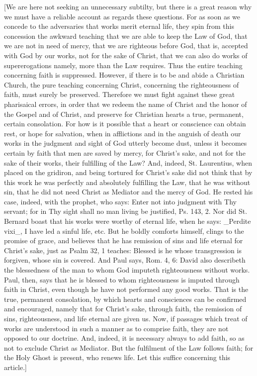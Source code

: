 [We are here not seeking an unnecessary subtilty, but there is a
great reason why we must have a reliable account as regards these
questions.  For as soon as we concede to the adversaries that works
merit eternal life, they spin from this concession the awkward
teaching that we are able to keep the Law of God, that we are not in
need of mercy, that we are righteous before God, that is, accepted
with God by our works, not for the sake of Christ, that we can also
do works of supererogations namely, more than the Law requires.  Thus
the entire teaching concerning faith is suppressed.  However, if
there is to be and abide a Christian Church, the pure teaching
concerning Christ, concerning the righteousness of faith, must surely
be preserved.  Therefore we must fight against these great
pharisaical errors, in order that we redeem the name of Christ and
the honor of the Gospel and of Christ, and preserve for Christian
hearts a true, permanent, certain consolation.  For how is it
possible that a heart or conscience can obtain rest, or hope for
salvation, when in afflictions and in the anguish of death our works
in the judgment and sight of God utterly become dust, unless it
becomes certain by faith that men are saved by mercy, for Christ's
sake, and not for the sake of their works, their fulfilling of the
Law?  And, indeed, St. Laurentius, when placed on the gridiron, and
being tortured for Christ's sake did not think that by this work he
was perfectly and absolutely fulfilling the Law, that he was without
sin, that he did not need Christ as Mediator and the mercy of God.
He rested his case, indeed, with the prophet, who says: Enter not
into judgment with Thy servant; for in Thy sight shall no man living
be justified, Ps. 143, 2. Nor did St. Bernard boast that his works
were worthy of eternal life, when he says: _Perdite vixi_, I have led
a sinful life, etc. But he boldly comforts himself, clings to the
promise of grace, and believes that he has remission of sins and life
eternal for Christ's sake, just as Psalm 32, 1 teaches: Blessed is he
whose transgression is forgiven, whose sin is covered.  And Paul says,
Rom. 4, 6: David also describeth the blessedness of the man to whom
God imputeth righteousness without works.  Paul, then, says that he
is blessed to whom righteousness is imputed through faith in Christ,
even though he have not performed any good works.  That is the true,
permanent consolation, by which hearts and consciences can be
confirmed and encouraged, namely that for Christ's sake, through
faith, the remission of sins, righteousness, and life eternal are
given us.  Now, if passages which treat of works are understood in
such a manner as to comprise faith, they are not opposed to our
doctrine.  And, indeed, it is necessary always to add faith, so as
not to exclude Christ as Mediator.  But the fulfilment of the Law
follows faith; for the Holy Ghost is present, who renews life.  Let
this suffice concerning this article.]


